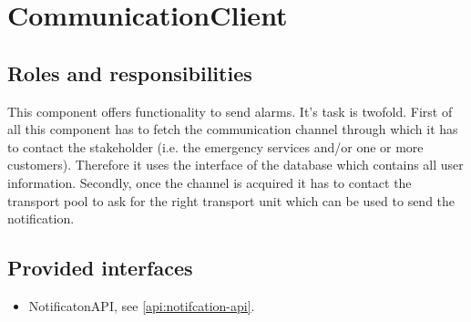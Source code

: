 \section{CommunicationClient}
\label{element:communication-client}

\subsection{Roles and responsibilities}

\npar This component offers functionality to send alarms. It's task is
twofold. First of all this component has to fetch the communication channel
through which it has to contact the stakeholder (i.e. the emergency services
and/or one or more customers). Therefore it uses the 
interface of the database which contains all user information. Secondly, once
the channel is acquired it has to contact the transport pool to ask for the
right transport unit which can be used to send the notification.

\subsection{Provided interfaces}

\begin{itemize}
  \item NotificatonAPI, see \ref{api:notifcation-api}.
\end{itemize}